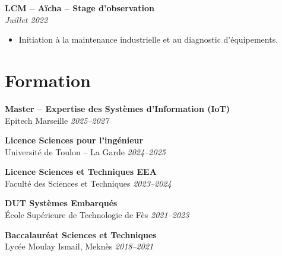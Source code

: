 \documentclass[10pt,a4paper]{article}
\begin{document}
\begin{minipage}[t]{0.63\textwidth}
\textbf{LCM – Aïcha – Stage d’observation}\\
\textit{Juillet 2022}
\begin{itemize}
\item Initiation à la maintenance industrielle et au diagnostic d’équipements.
\end{itemize}

\section*{Formation}

\textbf{Master – Expertise des Systèmes d’Information (IoT)}\\
Epitech Marseille \textit{2025–2027}

\textbf{Licence Sciences pour l'ingénieur}\\
Université de Toulon – La Garde \textit{2024–2025}

\textbf{Licence Sciences et Techniques EEA}\\
Faculté des Sciences et Techniques \textit{2023–2024}

\textbf{DUT Systèmes Embarqués}\\
École Supérieure de Technologie de Fès \textit{2021–2023}

\textbf{Baccalauréat Sciences et Techniques}\\
Lycée Moulay Ismail, Meknès \textit{2018–2021}

\end{minipage}
\hfill
\end{document}
